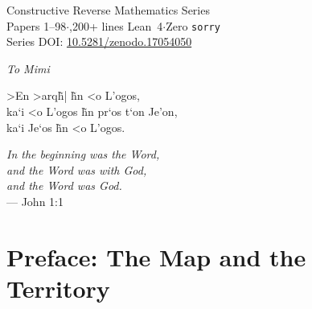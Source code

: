 \documentclass[11pt,twoside,openany]{report}
\theoremstyle{remark}
\newcommand{\BISH}{\textsf{BISH}}
\begin{document}
\begin{titlepage}

\vfill
{\footnotesize Constructive Reverse Mathematics Series\\
Papers 1--98\quad$\cdot$,200+ lines Lean~4\quad$\cdot$\quad Zero \texttt{sorry}\\[4pt]
Series DOI: \href{https://doi.org/10.5281/zenodo.17054050}{10.5281/zenodo.17054050}\par}
\end{titlepage}

\clearpage
\thispagestyle{empty}
\vspace*{\fill}
\begin{center}
\textit{To Mimi}
\end{center}
\vspace*{\fill}

\clearpage
\thispagestyle{empty}
\vspace*{\fill}
\begin{center}
{\large
\foreignlanguage{greek}{%
>En >arq\~h| \~hn <o L'ogos,\\[4pt]
ka`i <o L'ogos \~hn pr`os t`on Je'on,\\[4pt]
ka`i Je`os \~hn <o L'ogos.%
}}
\end{center}
\vspace{1cm}
\begin{center}
\normalsize\textit{In the beginning was the Word,\\
and the Word was with God,\\
and the Word was God.}\\[6pt]
--- John 1:1
\end{center}
\vspace*{\fill}

\tableofcontents
\clearpage

\chapter*{Preface: The Map and the Territory}
\end{document}
